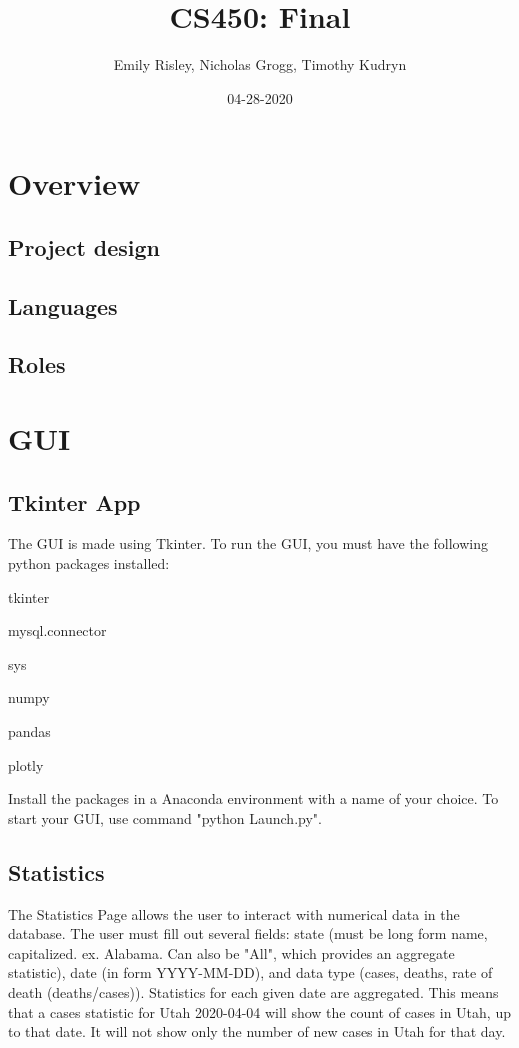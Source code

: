 \documentclass{article}
\title{CS450: Final }
\author{Emily Risley, Nicholas Grogg, Timothy Kudryn}
\date{04-28-2020}
\begin{document}
\maketitle

\section{Overview}

\subsection{Project design}

\subsection{Languages}

\subsection{Roles}

\section{GUI}
\subsection{Tkinter App}
\noindent
The GUI is made using Tkinter.  To run the GUI, you must have the following python packages installed:

tkinter

mysql.connector

sys

numpy

pandas

plotly

\noindent
Install the packages in a Anaconda environment with a name of your choice.  To start your GUI, use command "python Launch.py".
\subsection{Statistics}
\noindent
The Statistics Page allows the user to interact with numerical data in the database.  The user must fill out several fields: state (must be long form name, capitalized.  ex. Alabama.  Can also be "All", which provides an aggregate statistic), date (in form YYYY-MM-DD), and data type (cases, deaths, rate of death (deaths/cases)).
\noindent
Statistics for each given date are aggregated.  This means that a cases statistic for Utah 2020-04-04 will show the count of cases in Utah, up to that date.  It will not show only the number of new cases in Utah for that day.
\end{document}
